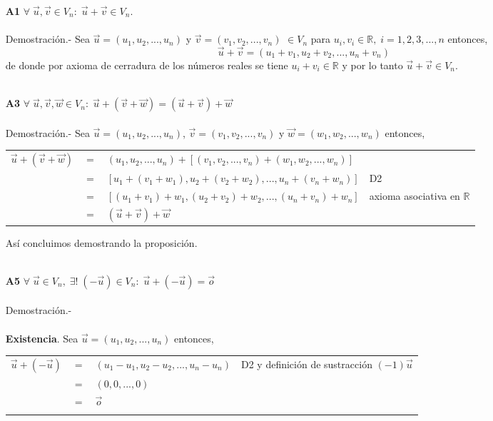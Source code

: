 \begin{enumerate}

\item [\large\bfseries A1] $\forall \;\vec{u}, \vec{v} \in V_n:\; \vec{u} + \vec{v} \in V_n$.\\\\
    Demostración.- Sea $\vec{u} = (u_1,u_2,...,u_n)$ y $\vec{v} = (v_1,v_2,...,v_n)$ $\in V_n$ para $u_i ,v_i \in \mathbb{R}, \; i = 1,2,3,...,n$ entonces, $$\vec{u}+\vec{v} = (u_1+v_1,u_2+v_2,...,u_n+v_n)$$
    de donde por axioma de cerradura de los números reales se tiene $u_i+v_i \in \mathbb{R}$ y por lo tanto $\vec{u}+\vec{v} \in V_n$.\\\\

\item [\large\bfseries A3] $\forall \; \vec{u},\vec{v},\vec{w} \in V_n:\; \vec{u} + (\vec{v}+\vec{w}) = (\vec{u} + \vec{v}) + \vec{w}$\\\\
    Demostración.-\; Sea $\vec{u} = (u_1,u_2,...,u_n)$, $\vec{v} = (v_1,v_2,...,v_n)$ y $\vec{w} = (w_1,w_2,...,w_n)$ entonces, 
    \begin{center}
	\begin{tabular}{rcll}
	    $\vec{u} + (\vec{v}+\vec{w})$&$=$&$(u_1,u_2,...,u_n) + \left[(v_1,v_2,...,v_n) + (w_1,w_2,...,w_n)\right]$&\\
	    &$=$&$\left[u_1+(v_1+w_1),u_2+(v_2+w_2),...,u_n+(v_n+w_n)\right]$&D2\\
	    &$=$&$\left[(u_1+v_1)+w_1,(u_2+v_2)+w_2,...,(u_n+v_n)+w_n\right]$& axioma asociativa en $\mathbb{R}$\\
	    &$=$&$(\vec{u}+\vec{v})+\vec{w}$&\\
	\end{tabular}
    \end{center}
    Así concluimos demostrando la proposición.\\\\

\item [\large\bfseries A5] $\forall\; \vec{u} \in V_n, \;\exists! \; (-\vec{u}) \in V_n : \; \vec{u} + (-\vec{u}) = \vec{o}$\\\\
    Demostración.-\;\\\\ \textbf{Existencia}.  Sea $\vec{u} = (u_1,u_2,...,u_n)$ entonces,
    \begin{center}
	\begin{tabular}{rcll}
	    $\vec{u}+(-\vec{u})$&$=$&$(u_1-u_1,u_2-u_2,...,u_n-u_n)$&D2 y definición de sustracción $(-1)\vec{u}$\\
	    &$=$&$(0,0,...,0)$&\\
	    &$=$&$\vec{o}$&\\\\
	\end{tabular}
    \end{center}


\end{enumerate}
